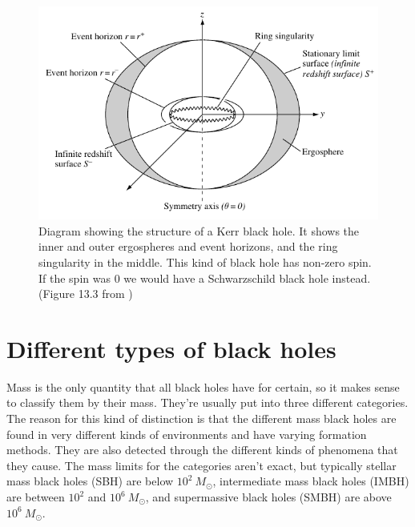 \documentclass[english, oneside]{HYgradu}
\begin{document}
\begin{figure}[h!tb]
\centering
\includegraphics[width=\textwidth]{../images/kerrhole.pdf}
\caption{Diagram showing the structure of a Kerr black hole. It shows the inner and outer ergospheres and event horizons, and the ring singularity in the middle. This kind of black hole has non-zero spin. If the spin was 0 we would have a Schwarzschild black hole instead.
(Figure 13.3 from \cite{grintro})}
\label{fig:KerrHole}
\end{figure}





\section{Different types of black holes}

Mass is the only quantity that all black holes have for certain, so it makes sense to classify them by their mass. They're usually put into three different categories. The reason for this kind of distinction is that the different mass black holes are found in very different kinds of environments and have varying formation methods. They are also detected through the different kinds of phenomena that they cause. %
The mass limits for the categories aren't exact, but typically stellar mass black holes (SBH) are below $10^2 \ M_\odot$, intermediate mass black holes (IMBH) are between $10^2$ and $10^6 \ M_\odot$, and supermassive black holes (SMBH) are above $10^6 \ M_\odot$.
\end{document}
